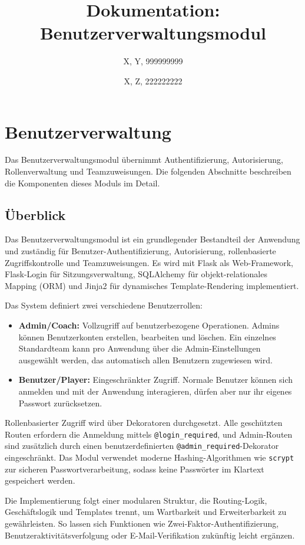 \documentclass[12pt]{article}
\title{Dokumentation: Benutzerverwaltungsmodul}
\author{X, Y, 999999999\\ \and X, Z, 222222222}
\date{}
\begin{document}
\maketitle
\tableofcontents
\newpage

\section{Benutzerverwaltung}

Das Benutzerverwaltungsmodul übernimmt Authentifizierung, Autorisierung, Rollenverwaltung und Teamzuweisungen. Die folgenden Abschnitte beschreiben die Komponenten dieses Moduls im Detail.

\subsection{Überblick}

Das Benutzerverwaltungsmodul ist ein grundlegender Bestandteil der Anwendung und zuständig für Benutzer-Authentifizierung, Autorisierung, rollenbasierte Zugriffskontrolle und Teamzuweisungen. Es wird mit Flask als Web-Framework, Flask-Login für Sitzungsverwaltung, SQLAlchemy für objekt-relationales Mapping (ORM) und Jinja2 für dynamisches Template-Rendering implementiert.

\noindent Das System definiert zwei verschiedene Benutzerrollen:
\begin{itemize}
  \item \textbf{Admin/Coach:} Vollzugriff auf benutzerbezogene Operationen. Admins können Benutzerkonten erstellen, bearbeiten und löschen. Ein einzelnes Standardteam kann pro Anwendung über die Admin-Einstellungen ausgewählt werden, das automatisch allen Benutzern zugewiesen wird.
  \item \textbf{Benutzer/Player:} Eingeschränkter Zugriff. Normale Benutzer können sich anmelden und mit der Anwendung interagieren, dürfen aber nur ihr eigenes Passwort zurücksetzen.
\end{itemize}
\noindent Rollenbasierter Zugriff wird über Dekoratoren durchgesetzt. Alle geschützten Routen erfordern die Anmeldung mittels \texttt{@login\_required}, und Admin-Routen sind zusätzlich durch einen benutzerdefinierten \texttt{@admin\_required}-Dekorator eingeschränkt. Das Modul verwendet moderne Hashing-Algorithmen wie \texttt{scrypt} zur sicheren Passwortverarbeitung, sodass keine Passwörter im Klartext gespeichert werden.

\noindent Die Implementierung folgt einer modularen Struktur, die Routing-Logik, Geschäftslogik und Templates trennt, um Wartbarkeit und Erweiterbarkeit zu gewährleisten. So lassen sich Funktionen wie Zwei-Faktor-Authentifizierung, Benutzeraktivitätsverfolgung oder E-Mail-Verifikation zukünftig leicht ergänzen.
\end{document}
